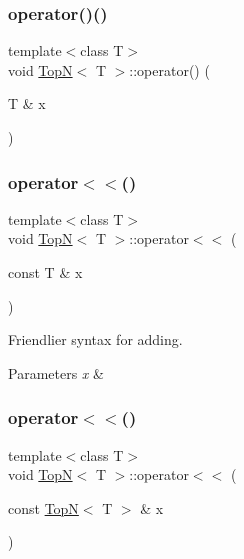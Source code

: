 \subsubsection{\texorpdfstring{operator()()}{operator()()}}
{\footnotesize\ttfamily template$<$class T$>$ \\
void \hyperlink{class_top_n}{TopN}$<$ T $>$\+::operator() (\begin{DoxyParamCaption}\item[{T \&}]{x }\end{DoxyParamCaption})\hspace{0.3cm}{\ttfamily [inline]}}

\mbox{\label{class_top_n_a719a9b488e33a8266a25c594a8eb579d}} 
\subsubsection{\texorpdfstring{operator$<$$<$()}{operator<<()}\hspace{0.1cm}{\footnotesize\ttfamily [1/2]}}
{\footnotesize\ttfamily template$<$class T$>$ \\
void \hyperlink{class_top_n}{TopN}$<$ T $>$\+::operator$<$$<$ (\begin{DoxyParamCaption}\item[{const T \&}]{x }\end{DoxyParamCaption})\hspace{0.3cm}{\ttfamily [inline]}}

Friendlier syntax for adding. 
\begin{DoxyParams}{Parameters}
{\em x} & \\
\hline
\end{DoxyParams}
\mbox{\label{class_top_n_a4a4459831455f21c152f99993aa0a274}} 
\subsubsection{\texorpdfstring{operator$<$$<$()}{operator<<()}\hspace{0.1cm}{\footnotesize\ttfamily [2/2]}}
{\footnotesize\ttfamily template$<$class T$>$ \\
void \hyperlink{class_top_n}{TopN}$<$ T $>$\+::operator$<$$<$ (\begin{DoxyParamCaption}\item[{const \hyperlink{class_top_n}{TopN}$<$ T $>$ \&}]{x }\end{DoxyParamCaption})\hspace{0.3cm}{\ttfamily [inline]}}

